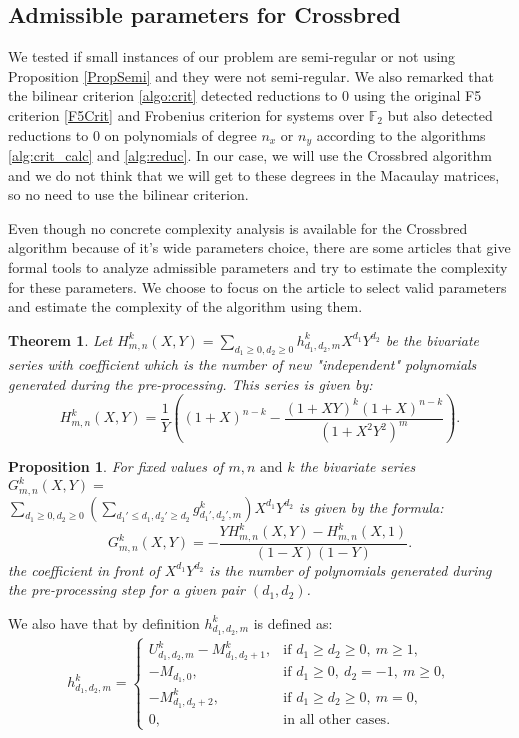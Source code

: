 \documentclass[english]{article}
\newtheorem{proposition}{Proposition}[section]
\newtheorem{theorem}{Theorem}[section]
\begin{document}
	\subsection{Admissible parameters for Crossbred}
		We tested if small instances of our problem are semi-regular or not using Proposition \ref{PropSemi} and they were not semi-regular. We also remarked that the bilinear criterion \ref{algo:crit} detected reductions to 0 using the original F5 criterion \ref{F5Crit} and Frobenius criterion for systems over $\mathbb{F}_2$ but also detected reductions to 0 on polynomials of degree $n_x$ or $n_y$ according to the algorithms \ref{alg:crit_calc} and \ref{alg:reduc}. In our case, we will use the Crossbred algorithm and we do not think that we will get to these degrees in the Macaulay matrices, so no need to use the bilinear criterion.
		
		Even though no concrete complexity analysis is available for the Crossbred algorithm because of it's wide parameters choice, there are some articles that give formal tools to analyze admissible parameters and try to estimate the complexity for these parameters. We choose to focus on the article \cite{VID24} to select valid parameters and estimate the complexity of the algorithm using them.
		
		\begin{theorem}\label{serie_=H}
			Let $H_{m, n}^k(X,Y) = \sum_{d_1 \geq 0, d_2 \geq 0} h_{d_1, d_2, m}^k X^{d_1}Y^{d_2}$ be the bivariate series with coefficient which is the number of new "independent" polynomials generated during the pre-processing. This series is given by:
			$$
				H_{m, n}^k(X, Y) = \frac{1}{Y}\left((1+X)^{n-k} - \frac{(1+XY)^k(1+X)^{n-k}}{(1+X^2Y^2)^m}\right).
			$$
		\end{theorem}
		
		\begin{proposition}\label{serie_G}
			For fixed values of $m, n \text{ and } k$ the bivariate series $G^{k}_{m,n}(X, Y) = $ \\ $\sum_{d_1 \geq 0, d_2 \geq 0}(\sum_{d_{1}' \leq d_1, d_{2}' \geq d_2} g_{d_{1}',d_{2}',m}^k)X^{d_1}Y^{d_2}$ is given by the formula:
			$$
				G^{k}_{m,n}(X, Y) = - \frac{YH_{m, n}^k(X,Y) - H_{m, n}^k(X, 1)}{(1-X)(1-Y)}.
			$$
			the coefficient in front of $X^{d_1}Y^{d_2}$ is the number of polynomials generated during the pre-processing step for a given pair $(d_1, d_2)$.
		\end{proposition}
		
		We also have that by definition \( h_{d_1, d_2, m}^k \) is defined as:
		\begin{align}
			h_{d_1, d_2, m}^k =
			\begin{cases}
				U_{d_1, d_2, m}^k - M_{d_1, d_2 + 1}^k, & \text{if } d_1 \geq d_2 \geq 0,\ m \geq 1, \\
				- M_{d_1, 0}, & \text{if } d_1 \geq 0,\ d_2 = -1,\ m \geq 0, \\
				- M_{d_1, d_2 + 2}^k, & \text{if } d_1 \geq d_2 \geq 0,\ m = 0, \\
				0, & \text{in all other cases}.
			\end{cases}
		\end{align}
		
\end{document}
